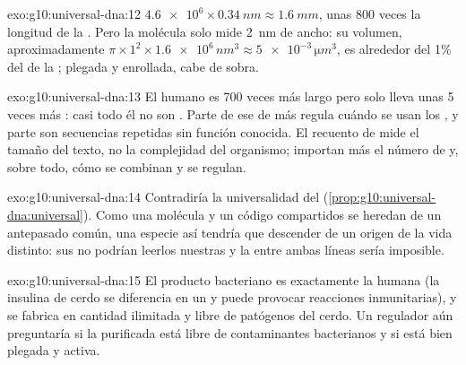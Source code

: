 \begin{solution}{exo:g10:universal-dna:12}
$\num{4.6e6} \times \qty{0.34}{nm} \approx \qty{1.6}{mm}$, unas 800
veces la longitud de la . Pero la molécula solo mide \qty{2}{nm}
de ancho: su volumen, aproximadamente $\pi \times 1^2 \times \num{1.6e6}\,
\unit{nm^3} \approx \num{5e-3}\,\unit{\micro m^3}$, es
alrededor del 1\% del de la ; plegada y enrollada, cabe de sobra.
\end{solution}

\begin{solution}{exo:g10:universal-dna:13}
El  humano es 700 veces más largo pero solo lleva unas 5 veces más
: casi todo él no son . Parte de ese  de más regula cuándo
se usan los , y parte son secuencias repetidas sin función
conocida. El recuento de  mide el tamaño del texto, no la
complejidad del organismo; importan más el número de  y, sobre
todo, cómo se combinan y se regulan.
\end{solution}

\begin{solution}{exo:g10:universal-dna:14}
Contradiría la universalidad del 
(\cref{prop:g10:universal-dna:universal}). Como una molécula y un
código compartidos se heredan de un antepasado común, una especie así
tendría que descender de un origen de la vida distinto: sus  no
podrían leerlos nuestras  y la  entre ambas líneas
sería imposible.
\end{solution}

\begin{solution}{exo:g10:universal-dna:15}
El producto bacteriano es exactamente la  humana (la insulina
de cerdo se diferencia en un  y puede provocar reacciones
inmunitarias), y se fabrica en cantidad ilimitada y libre de patógenos
del cerdo. Un regulador aún preguntaría si la  purificada está
libre de contaminantes bacterianos y si está bien plegada y activa.
\end{solution}

